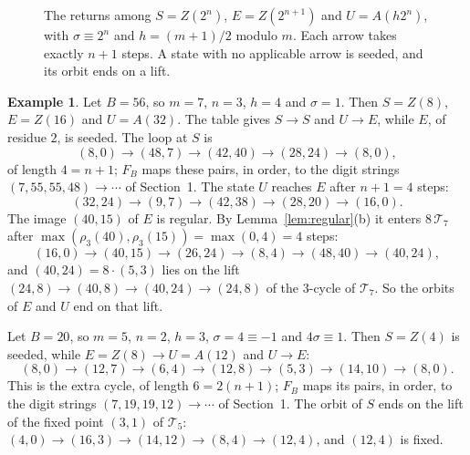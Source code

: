 \documentclass[11pt]{amsart}
\theoremstyle{definition}
\newtheorem*{example}{Example}
\theoremstyle{remark}
\newcommand{\T}{\mathcal{T}}
\begin{document}
\begin{figure}[h]
\centering
{}
\caption{The returns among $S=Z(2^n)$, $E=Z(2^{n+1})$ and $U=A(h2^n)$, with $\sigma\equiv2^n$ and $h=(m+1)/2$ modulo $m$. Each arrow takes exactly $n+1$ steps. A state with no applicable arrow is seeded, and its orbit ends on a lift.}\label{fig:graph}
\end{figure}
\begin{example}
Let $B=56$, so $m=7$, $n=3$, $h=4$ and $\sigma=1$. Then $S=Z(8)$, $E=Z(16)$ and $U=A(32)$. The table gives $S\to S$ and $U\to E$, while $E$, of residue $2$, is seeded. The loop at $S$ is
\[
(8,0)\to(48,7)\to(42,40)\to(28,24)\to(8,0),
\]
of length $4=n+1$; $F_B$ maps these pairs, in order, to the digit strings $(7,55,55,48)\to\cdots$ of Section~1. The state $U$ reaches $E$ after $n+1=4$ steps:
\[
(32,24)\to(9,7)\to(42,38)\to(28,20)\to(16,0).
\]
The image $(40,15)$ of $E$ is regular. By Lemma~\ref{lem:regular}(b) it enters $8\,\T_7$ after $\max(\rho_3(40),\rho_3(15))=\max(0,4)=4$ steps:
\[
(16,0)\to(40,15)\to(26,24)\to(8,4)\to(48,40)\to(40,24),
\]
and $(40,24)=8\cdot(5,3)$ lies on the lift $(24,8)\to(40,8)\to(40,24)\to(24,8)$ of the $3$-cycle of $\T_7$. So the orbits of $E$ and $U$ end on that lift.

Let $B=20$, so $m=5$, $n=2$, $h=3$, $\sigma=4\equiv-1$ and $4\sigma\equiv1$. Then $S=Z(4)$ is seeded, while $E=Z(8)\to U=A(12)$ and $U\to E$:
\[
(8,0)\to(12,7)\to(6,4)\to(12,8)\to(5,3)\to(14,10)\to(8,0).
\]
This is the extra cycle, of length $6=2(n+1)$; $F_B$ maps its pairs, in order, to the digit strings $(7,19,19,12)\to\cdots$ of Section~1. The orbit of $S$ ends on the lift of the fixed point $(3,1)$ of $\T_5$: $(4,0)\to(16,3)\to(14,12)\to(8,4)\to(12,4)$, and $(12,4)$ is fixed.
\end{example}
\end{document}
